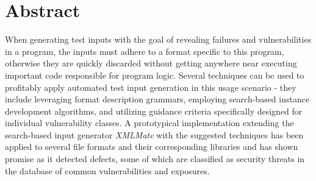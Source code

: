 \section*{Abstract}
When generating test inputs with the goal of revealing failures and vulnerabilities in a program, 
the inputs must adhere to a format specific to this program, otherwise they are 
quickly discarded without getting anywhere near executing important code responsible for program logic.
Several techniques can be used to profitably apply automated test input generation in this usage scenario -
they include leveraging format description grammars, employing search-based instance development algorithms,
and utilizing guidance criteria specifically designed for individual vulnerability classes.
A prototypical implementation extending the search-based input generator \emph{XMLMate} with the suggested
techniques has been applied to several file formats and their corresponding libraries and has shown promise as
it detected defects, some of which are classified as security threats in the database of common
vulnerabilities and exposures. 
